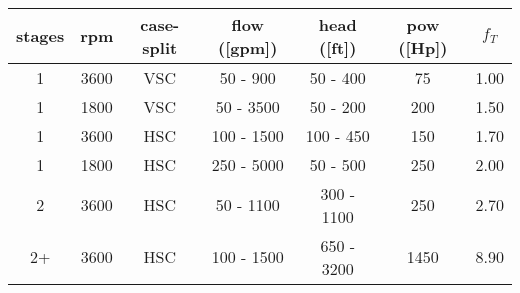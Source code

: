\strut \\
\strut \\
\strut \\
\begin{tabular}{ccccccc}%
	stages & rpm & case-split & flow ([gpm]) & head ([ft]) & pow ([Hp]) & $f_T$ \\ \hline
	1 & 3600 & VSC & 50 - 900 & 50 - 400 & 75 & 1.00 \\
	1 & 1800 & VSC & 50 - 3500 & 50 - 200 & 200 & 1.50 \\
	1 & 3600 & HSC & 100 - 1500 & 100 - 450 & 150 & 1.70 \\
	1 & 1800 & HSC & 250 - 5000 & 50 - 500 & 250 & 2.00 \\
	2 & 3600 & HSC & 50 - 1100 & 300 - 1100 & 250 & 2.70 \\
	2+ & 3600 & HSC & 100 - 1500 & 650 - 3200 & 1450 & 8.90 \\ \hline
\end{tabular}

